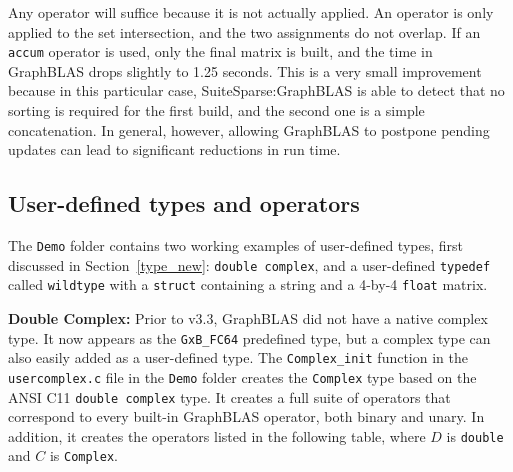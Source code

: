 \documentclass[12pt]{article}
\begin{document}
Any operator will suffice because it is not actually applied.  An operator is
only applied to the set intersection, and the two assignments do not overlap.
If an \verb'accum' operator is used, only the final matrix is built, and the
time in GraphBLAS drops slightly to 1.25 seconds.  This is a very small
improvement because in this particular case, SuiteSparse:GraphBLAS is able to
detect that no sorting is required for the first build, and the second one is a
simple concatenation.  In general, however, allowing GraphBLAS to postpone
pending updates can lead to significant reductions in run time.

\subsection{User-defined types and operators}
\label{user}

The \verb'Demo' folder contains two working examples of user-defined types,
first discussed in Section~\ref{type_new}: \verb'double complex', and a
user-defined \verb'typedef' called \verb'wildtype' with a \verb'struct'
containing a string and a 4-by-4 \verb'float' matrix.

{\bf Double Complex:}
Prior to v3.3, GraphBLAS did not have a native complex type.  It now appears as
the \verb'GxB_FC64' predefined type, but a complex type can also easily added
as a user-defined type.  The \verb'Complex_init' function in the
\verb'usercomplex.c' file in the \verb'Demo' folder creates the \verb'Complex'
type based on the ANSI C11 \verb'double complex' type.
It creates a full suite of operators that correspond to every
built-in GraphBLAS operator, both binary and unary.  In addition, it
creates the operators listed in the following table, where $D$ is
\verb'double' and $C$ is \verb'Complex'.
\end{document}
